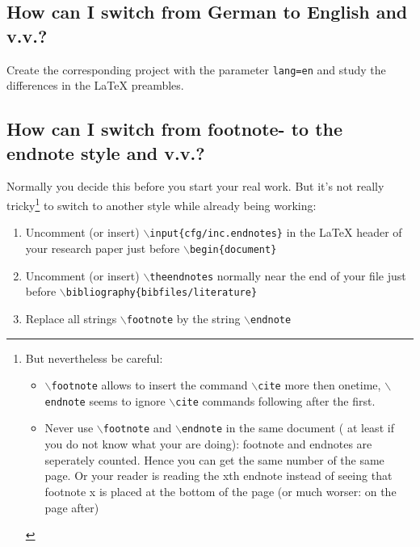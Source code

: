 \documentclass[
  DIV=calc,
  BCOR=5mm,
  11pt,
  headings=small,
  oneside,
  abstract=true,
  toc=bib,
  ngerman,english]{scrartcl}
\begin{document}
\subsection{How can I switch from German to English and v.v.?}

Create the corresponding project with the parameter  \texttt{lang=en}
and study the differences in the LaTeX preambles.

\subsection{How can I switch from footnote- to the endnote style and v.v.?}

Normally you decide this before you start your real work. But it's not
really tricky\footnote{
But nevertheless be careful: 
\begin{itemize}
  \item \texttt{$\backslash$footnote} allows to insert the command
  \texttt{$\backslash$cite} more then onetime, \texttt{$\backslash$endnote}
  seems to ignore \texttt{$\backslash$cite} commands following after the first.
  \item Never use \texttt{$\backslash$footnote} and \texttt{$\backslash$endnote}
  in the same document ( at least if you do not know what your are
  doing): footnote and endnotes are seperately counted. Hence you can get the
  same number of the same page. Or your reader is reading the xth endnote
  instead of seeing that footnote x is placed at the bottom of the page (or
  much worser: on the page after)
\end{itemize}} to switch to another style while already being working:

\begin{enumerate}
  \item Uncomment (or insert) 
  \texttt{$\backslash$input\{cfg/inc.endnotes\}} in the LaTeX header of
  your research paper just before \texttt{$\backslash$begin\{document\}}
  \item Uncomment (or insert) \texttt{$\backslash$theendnotes}
  normally near the end of your file just before
  \texttt{$\backslash$bibliography\{bibfiles/literature\}}
  \item Replace all strings \texttt{$\backslash$footnote} by the string
  \texttt{$\backslash$endnote}
\end{enumerate}


\end{document}
